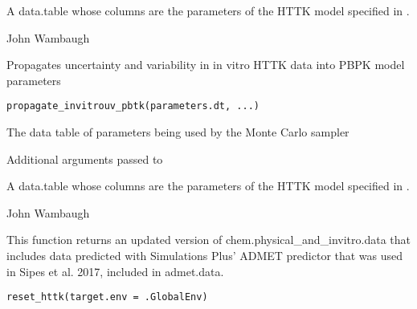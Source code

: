 \documentclass[a4paper]{book}
\begin{document}
%
\begin{Value}
A data.table whose columns are the parameters of the HTTK model
specified in .
\end{Value}
%
\begin{Author}\relax
John Wambaugh
\end{Author}
%
\begin{Description}\relax
Propagates uncertainty and variability in in vitro HTTK data into PBPK
model parameters
\end{Description}
%
\begin{Usage}
\begin{verbatim}
propagate_invitrouv_pbtk(parameters.dt, ...)
\end{verbatim}
\end{Usage}
%
\begin{Arguments}
\begin{ldescription}
\item[\code{parameters.dt}] The data table of parameters being used by the Monte
Carlo sampler

\item[\code{...}] Additional arguments passed to 
\end{ldescription}
\end{Arguments}
%
\begin{Value}
A data.table whose columns are the parameters of the HTTK model
specified in .
\end{Value}
%
\begin{Author}\relax
John Wambaugh
\end{Author}
%
\begin{Description}\relax
This function returns an updated version of chem.physical\_and\_invitro.data
that includes data predicted with Simulations Plus' ADMET predictor that was
used in Sipes et al. 2017, included in admet.data.
\end{Description}
%
\begin{Usage}
\begin{verbatim}
reset_httk(target.env = .GlobalEnv)
\end{verbatim}
\end{Usage}
\end{document}
